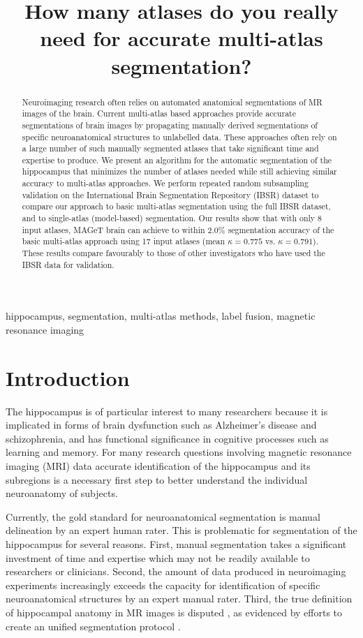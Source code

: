 \documentclass{article}\usepackage[]{graphicx}\usepackage[]{color}
\title{How many atlases do you really need for accurate multi-atlas segmentation?}
\begin{document}
\maketitle       

\begin{abstract}
Neuroimaging research often relies on automated anatomical segmentations of MR
images of the brain. Current multi-atlas based approaches provide accurate
segmentations of brain images by propagating manually derived segmentations of
specific neuroanatomical structures to unlabelled data. These approaches often
rely on a large number of such manually segmented atlases that take significant
time and expertise to produce. We present an algorithm for the automatic
segmentation of the hippocampus that minimizes the number of atlases needed
while still achieving similar accuracy to multi-atlas approaches.  We perform
repeated random subsampling validation on the International Brain Segmentation
Repository (IBSR) dataset to compare our approach to basic multi-atlas
segmentation using the full IBSR dataset, and to single-atlas (model-based)
segmentation. Our results show that with only 8 input atlases, MAGeT brain can
achieve to within 2.0\% segmentation accuracy of the basic multi-atlas approach
using 17 input atlases (mean $\kappa = 0.775$ vs.  $\kappa = 0.791$).  These
results compare favourably to those of other investigators who have used the IBSR
data for validation.
\end{abstract}

\begin{keywords}
hippocampus, segmentation, multi-atlas methods, label fusion, magnetic
resonance imaging 
\end{keywords}

\section{Introduction}
\label{sec:intro}

The hippocampus is of particular interest to many researchers because it is
implicated in forms of brain dysfunction such as Alzheimer's disease and
schizophrenia, and has functional significance in cognitive processes such as
learning and memory.  For many research questions involving magnetic resonance
imaging (MRI) data accurate identification of the hippocampus and its
subregions is a necessary first step to better understand the individual
neuroanatomy of subjects.  

Currently, the gold standard for neuroanatomical segmentation is manual
delineation by an expert human rater.  This is problematic for segmentation of
the hippocampus for several reasons.  First, manual segmentation takes a
significant investment of time and expertise \citep{Hammers2003} which may not
be readily available to researchers or clinicians.  Second, the amount of data
produced in neuroimaging experiments increasingly exceeds the capacity for
identification of specific neuroanatomical structures by an expert manual
rater.  Third, the true definition of hippocampal anatomy in MR images is
disputed \citep{Geuze2004}, as evidenced by efforts to create an unified
segmentation protocol \citep{Jack2011}.  
\end{document}
